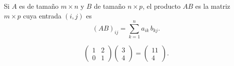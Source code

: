 
\begin{frame}

\begin{definition}[Producto]
Si $A$ es de tamaño $m \times n$ y $B$ de tamaño $n \times p$, el producto
$AB$ es la matriz $m \times p$ cuya entrada $(i, j)$ es
\[
  (AB)_{ij} = \sum_{k=1}^{n} a_{ik}\, b_{kj} .
\]
\end{definition}

\begin{example}
\[
  \begin{pmatrix} 1 & 2 \\ 0 & 1 \end{pmatrix}
  \begin{pmatrix} 3 \\ 4 \end{pmatrix}
  = \begin{pmatrix} 11 \\ 4 \end{pmatrix} .
\]
\end{example}
\end{frame}
